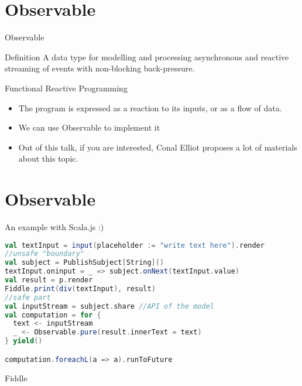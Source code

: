 \documentclass[presentation]{beamer}
\let\oldcite\cite
\renewcommand{\cite}[1]{{\color{blue}\oldcite{#1}}}
\begin{document}
\section{Observable}
\begin{frame}[fragile]{Observable}
\begin{block}{Definition}
A data type for modelling and processing asynchronous and reactive streaming of events with non-blocking back-pressure.
\end{block}
\begin{block}{Functional Reactive Programming \cite{wiki:functional} \cite{blackheath2016functional}}
\begin{itemize}
\item The program is expressed as a reaction to its inputs, or as a flow of data.
\item We can use Observable to implement it
\item Out of this talk, if you are interested, Conal Elliot \hyperlink{http://conal.net/}{\faExternalLink} proposes a lot of materials about this topic.
\end{itemize}
\end{block}
\end{frame}
\section{Observable}
\begin{frame}[fragile]{An example with Scala.js :)}
\begin{lstlisting}[language=Scala]
val textInput = input(placeholder := "write text here").render
//unsafe "boundary"
val subject = PublishSubject[String]() 
textInput.oninput = _ => subject.onNext(textInput.value)
val result = p.render
Fiddle.print(div(textInput), result)
//safe part
val inputStream = subject.share //API of the model
val computation = for {
  text <- inputStream
  _ <- Observable.pure(result.innerText = text)
} yield()

computation.foreachL(a => a).runToFuture
\end{lstlisting}  
\begin{center}
Fiddle \hyperlink{https://scalafiddle.io/sf/0uDr1Cr/1}{\faExternalLink}
\end{center}
\end{frame}
\end{document}
